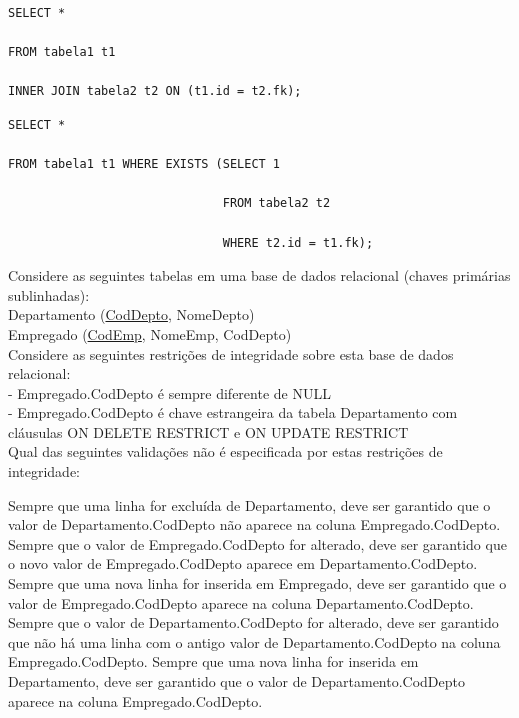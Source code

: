 \documentclass[12pt, addpoints]{exam}
\begin{document}
\begin{questions}
\begin{choices}
\begin{verbatim}
\end{verbatim}


\choice \begin{verbatim}SELECT *

FROM tabela1 t1

INNER JOIN tabela2 t2 ON (t1.id = t2.fk);

\end{verbatim}


\choice \begin{verbatim}SELECT *

FROM tabela1 t1 WHERE EXISTS (SELECT 1

                              FROM tabela2 t2

                              WHERE t2.id = t1.fk);

\end{verbatim}


\end{choices}

\question

Considere as seguintes tabelas em uma base de dados relacional (chaves primárias sublinhadas):\\

Departamento (\underline{CodDepto}, NomeDepto)\\

Empregado (\underline{CodEmp}, NomeEmp, CodDepto)\\

Considere as seguintes restrições de integridade sobre esta base de dados relacional:\\

- Empregado.CodDepto é sempre diferente de NULL\\

- Empregado.CodDepto é chave estrangeira da tabela Departamento com cláusulas ON DELETE RESTRICT e ON UPDATE RESTRICT\\

Qual das seguintes validações não é especificada por estas restrições de integridade:
\begin{choices}
\choice Sempre que uma linha for excluída de Departamento, deve ser garantido que o valor de Departamento.CodDepto não aparece na coluna Empregado.CodDepto.
\choice Sempre que o valor de Empregado.CodDepto for alterado, deve ser garantido que o novo valor de Empregado.CodDepto aparece em Departamento.CodDepto.
\choice Sempre que uma nova linha for inserida em Empregado, deve ser garantido que o valor de Empregado.CodDepto aparece na coluna Departamento.CodDepto.
\choice Sempre que o valor de Departamento.CodDepto for alterado, deve ser garantido que não há uma linha com o antigo valor de Departamento.CodDepto na coluna Empregado.CodDepto.
\choice Sempre que uma nova linha for inserida em Departamento, deve ser garantido que o valor de Departamento.CodDepto aparece na coluna Empregado.CodDepto.
\end{choices}


\end{questions}
\end{document}
